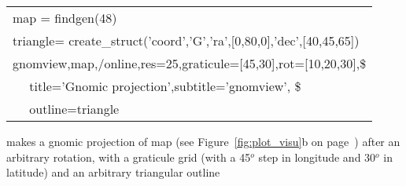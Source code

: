 \begin{examples}{2}
{
\begin{tabular}{l} %

map  = findgen(48) \\
triangle= create\_struct('coord','G','ra',[0,80,0],'dec',[40,45,65]) \\
gnomview,map,/online,res=25,graticule=[45,30],rot=[10,20,30],\$ \\
$\quad$	   title='Gnomic projection',subtitle='gnomview', \$ \\
$\quad$           outline=triangle \\
\end{tabular}
}
{makes a gnomic projection of map (see Figure~\ref{fig:plot_visu}b on
page~\pageref{page:plot_visu}) after an arbitrary rotation, with a graticule grid
(with a 45$^o$ step in longitude and 30$^o$ in latitude) and an arbitrary triangular outline}
\end{examples}
